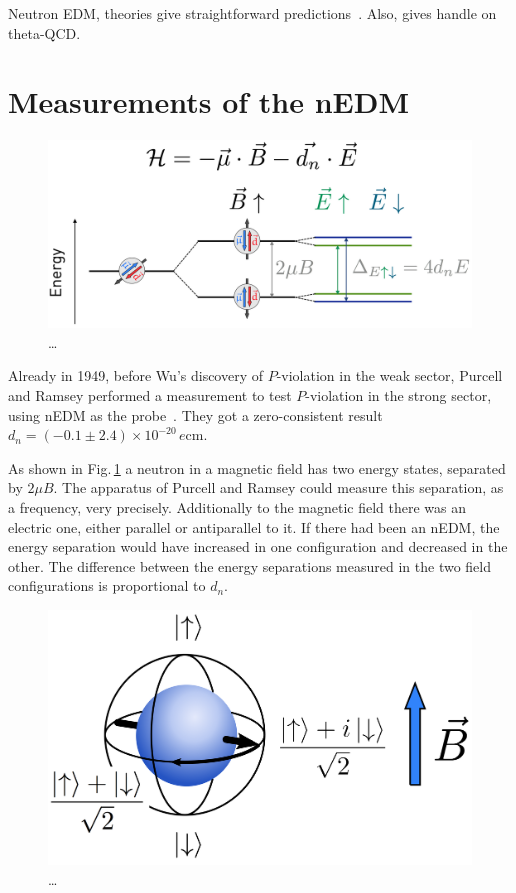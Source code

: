 Neutron EDM, theories give straightforward predictions~\cite{Ellis1989}. Also, gives handle on theta-QCD.



\section{Measurements of the nEDM}

\begin{figure}
  \centering
  \includegraphics[width=\linewidth]{gfx/nEDMatPSI/measurement_principle.png}
  \caption{\ldots}
  \label{fig:nEDM_measurement_principle}
\end{figure}

Already in 1949, before Wu's discovery of $P$-violation in the weak sector, Purcell and Ramsey performed a measurement to test $P$-violation in the strong sector, using nEDM as the probe~\cite{PhysRev.108.120}. They got a zero-consistent result $d_n = (-0.1 \pm 2.4) \times 10^{-20}\,\si{\elementarycharge\centi\meter}$.

As shown in Fig.\,\ref{fig:nEDM_measurement_principle} a neutron in a magnetic field has two energy states, separated by $2 \mu B$. The apparatus of Purcell and Ramsey could measure this separation, as a frequency, very precisely. Additionally to the magnetic field there was an electric one, either parallel or antiparallel to it. If there had been an nEDM, the energy separation would have increased in one configuration and decreased in the other. The difference between the energy separations measured in the two field configurations is proportional to $d_n$.

\begin{figure}
  \centering
  \includegraphics[width=.6\linewidth]{gfx/nEDMatPSI/bloch_sphere.png}
  \caption{\ldots}
  \label{fig:nEDM_bloch_sphere}
\end{figure}

